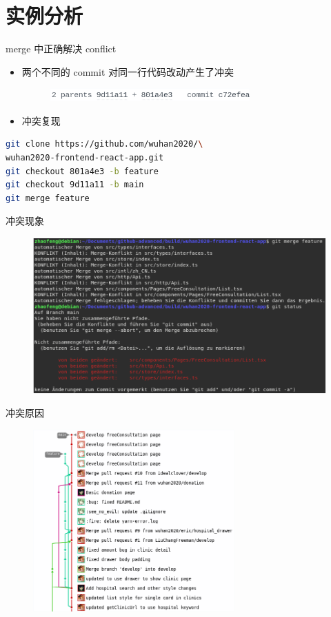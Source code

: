 \documentclass[notheorems,xetex]{beamer}
\begin{document}
\section{实例分析}
\frame{\tableofcontents[currentsection]}
\begin{frame}[fragile]{merge 中正确解决 conflict}
\begin{itemize}
\item 两个不同的 commit 对同一行代码改动产生了冲突
     \begin{figure}
	\centering
	\includegraphics[height=0.5cm]{conflict.png}
	\end{figure}
\item 冲突复现
\end{itemize}
\begin{lstlisting}[language=bash]
git clone https://github.com/wuhan2020/\
wuhan2020-frontend-react-app.git
git checkout 801a4e3 -b feature
git checkout 9d11a11 -b main
git merge feature
\end{lstlisting}

\end{frame}
\begin{frame}{冲突现象}

\begin{figure}
	\centering
	\includegraphics[height=6cm]{phenomenon.png}
\end{figure}
\end{frame}
\begin{frame}{冲突原因}
\begin{figure}
	\centering
	\includegraphics[height=7cm]{deps.png}
\end{figure}
\end{frame}
\end{document}
